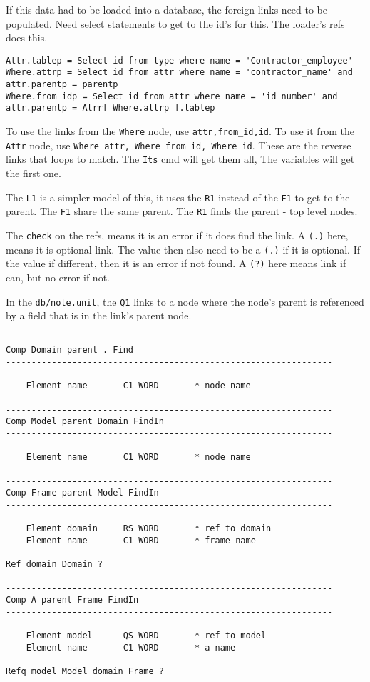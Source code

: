 If this data had to be loaded into a database, the foreign links need to
be populated. Need select statements to get to the id's for this. The
loader's refs does this.

\begin{verbatim}
Attr.tablep = Select id from type where name = 'Contractor_employee'
Where.attrp = Select id from attr where name = 'contractor_name' and attr.parentp = parentp
Where.from_idp = Select id from attr where name = 'id_number' and attr.parentp = Atrr[ Where.attrp ].tablep
\end{verbatim}

To use the links from the \texttt{Where} node, use
\texttt{attr,from\_id,id}. To use it from the \texttt{Attr} node, use
\texttt{Where\_attr,\ Where\_from\_id,\ Where\_id}. These are the
reverse links that loops to match. The \texttt{Its} cmd will get them
all, The variables will get the first one.

The \texttt{L1} is a simpler model of this, it uses the \texttt{R1}
instead of the \texttt{F1} to get to the parent. The \texttt{F1} share
the same parent. The \texttt{R1} finds the parent - top level nodes.

The \texttt{check} on the refs, means it is an error if it does find the
link. A \texttt{(.)} here, means it is optional link. The value then
also need to be a \texttt{(.)} if it is optional. If the value if
different, then it is an error if not found. A \texttt{(?)} here means
link if can, but no error if not.

In the \texttt{db/note.unit}, the \texttt{Q1} links to a node where the
node's parent is referenced by a field that is in the link's parent
node.

\begin{verbatim}
----------------------------------------------------------------
Comp Domain parent . Find
----------------------------------------------------------------

    Element name       C1 WORD       * node name
    
----------------------------------------------------------------
Comp Model parent Domain FindIn
----------------------------------------------------------------

    Element name       C1 WORD       * node name

----------------------------------------------------------------
Comp Frame parent Model FindIn
----------------------------------------------------------------

    Element domain     RS WORD       * ref to domain
    Element name       C1 WORD       * frame name
    
Ref domain Domain ?

----------------------------------------------------------------
Comp A parent Frame FindIn
----------------------------------------------------------------

    Element model      QS WORD       * ref to model
    Element name       C1 WORD       * a name

Refq model Model domain Frame ?
\end{verbatim}

